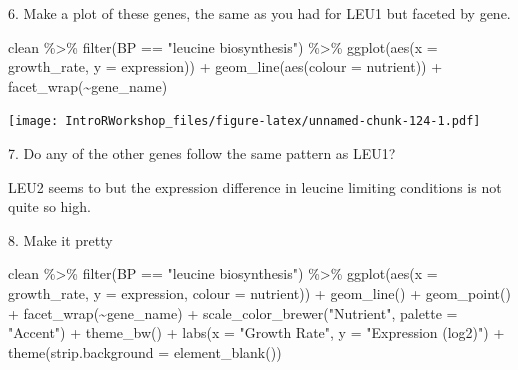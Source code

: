 \documentclass[
]{book}
\newenvironment{Shaded}{\begin{snugshade}}{\end{snugshade}}
\newcommand{\AttributeTok}[1]{\textcolor[rgb]{0.77,0.63,0.00}{#1}}
\newcommand{\FunctionTok}[1]{\textcolor[rgb]{0.00,0.00,0.00}{#1}}
\newcommand{\NormalTok}[1]{#1}
\newcommand{\SpecialCharTok}[1]{\textcolor[rgb]{0.00,0.00,0.00}{#1}}
\newcommand{\StringTok}[1]{\textcolor[rgb]{0.31,0.60,0.02}{#1}}
\begin{document}
6. Make a plot of these genes, the same as you had for LEU1 but faceted by gene.

\begin{Shaded}
\begin{Highlighting}[]
\NormalTok{clean }\SpecialCharTok{\%\textgreater{}\%}
  \FunctionTok{filter}\NormalTok{(BP }\SpecialCharTok{==} \StringTok{"leucine biosynthesis"}\NormalTok{) }\SpecialCharTok{\%\textgreater{}\%}
  \FunctionTok{ggplot}\NormalTok{(}\FunctionTok{aes}\NormalTok{(}\AttributeTok{x =}\NormalTok{ growth\_rate, }\AttributeTok{y =}\NormalTok{ expression)) }\SpecialCharTok{+}
    \FunctionTok{geom\_line}\NormalTok{(}\FunctionTok{aes}\NormalTok{(}\AttributeTok{colour =}\NormalTok{ nutrient)) }\SpecialCharTok{+}
    \FunctionTok{facet\_wrap}\NormalTok{(}\SpecialCharTok{\textasciitilde{}}\NormalTok{gene\_name)}
\end{Highlighting}
\end{Shaded}

\texttt{[image: IntroRWorkshop\_files/figure-latex/unnamed-chunk-124-1.pdf]}

7. Do any of the other genes follow the same pattern as LEU1?

LEU2 seems to but the expression difference in leucine limiting conditions is not quite so high.

8. Make it pretty

\begin{Shaded}
\begin{Highlighting}[]
\NormalTok{clean }\SpecialCharTok{\%\textgreater{}\%}
  \FunctionTok{filter}\NormalTok{(BP }\SpecialCharTok{==} \StringTok{"leucine biosynthesis"}\NormalTok{) }\SpecialCharTok{\%\textgreater{}\%}
  \FunctionTok{ggplot}\NormalTok{(}\FunctionTok{aes}\NormalTok{(}\AttributeTok{x =}\NormalTok{ growth\_rate, }\AttributeTok{y =}\NormalTok{ expression, }\AttributeTok{colour =}\NormalTok{ nutrient)) }\SpecialCharTok{+}
    \FunctionTok{geom\_line}\NormalTok{() }\SpecialCharTok{+}
    \FunctionTok{geom\_point}\NormalTok{() }\SpecialCharTok{+}
    \FunctionTok{facet\_wrap}\NormalTok{(}\SpecialCharTok{\textasciitilde{}}\NormalTok{gene\_name) }\SpecialCharTok{+}
    \FunctionTok{scale\_color\_brewer}\NormalTok{(}\StringTok{"Nutrient"}\NormalTok{, }\AttributeTok{palette =} \StringTok{"Accent"}\NormalTok{) }\SpecialCharTok{+}
    \FunctionTok{theme\_bw}\NormalTok{() }\SpecialCharTok{+}
    \FunctionTok{labs}\NormalTok{(}\AttributeTok{x =} \StringTok{"Growth Rate"}\NormalTok{, }\AttributeTok{y =} \StringTok{"Expression (log2)"}\NormalTok{) }\SpecialCharTok{+}
    \FunctionTok{theme}\NormalTok{(}\AttributeTok{strip.background =} \FunctionTok{element\_blank}\NormalTok{())}
\end{Highlighting}
\end{Shaded}
\end{document}
